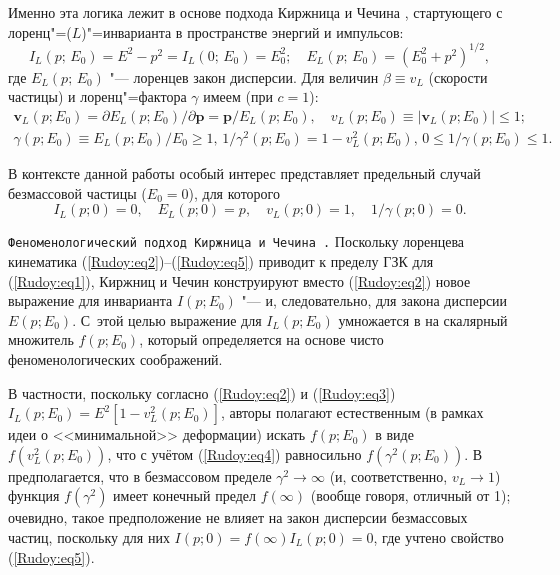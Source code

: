  Именно эта логика лежит в основе подхода Киржница и Чечина
\cite{Rudoy:KIRSHNIZ}, стартующего с лоренц"=($L$)"=инварианта  в пространстве энергий и импульсов:
\begin{equation}
    I_L(p;\,E_0)=E^2-p^2=I_L(0;\,E_0)=E_0^2;\quad E_L(p;\,E_0)=(E_0^2+p^2)^{1/2},
    \label{Rudoy:eq2}
\end{equation}
где $E_L(p;\,E_0)$ "--- лоренцев закон дисперсии. Для величин $\beta\equiv v_L$ (скорости частицы) и лоренц"=фактора $\gamma$
имеем (при $c=1$):
\begin{gather}
    \textbf{v}_L(p;E_0)=\partial E_L(p;E_0)/\partial\textbf{p}=\textbf{p}/E_L(p;E_0),\quad  v_L(p;E_0)\equiv|\textbf{v}_L(p;E_0)|\leq1;
    \label{Rudoy:eq3}\\
    \gamma(p;E_0){\equiv}E_L(p;E_0)/E_0 {\geq1},\, 1/\gamma^2(p;E_0){=}1-v_L^2(p;E_0),\, 0{\leq}1/\gamma(p;E_0){\leq}1.
    \label{Rudoy:eq4}
\end{gather}

В контексте данной работы особый  интерес представляет предельный случай безмассовой частицы ($E_0=0$), для которого
\begin{equation}
    I_L(p;0)=0,\quad E_L(p;0)=p, \quad  v_L(p;0)=1, \quad 1/\gamma(p;0)=0.
    \label{Rudoy:eq5}
\end{equation}

\smallskip
{\tt Феноменологический подход Киржница и Чечина  \cite{Rudoy:KIRSHNIZ}.} Поскольку лоренцева кинематика 
(\ref{Rudoy:eq2})--(\ref{Rudoy:eq5}) приводит к пределу ГЗК для (\ref{Rudoy:eq1}), Киржниц и Чечин \cite{Rudoy:KIRSHNIZ} конструируют вместо
(\ref{Rudoy:eq2}) новое выражение для инварианта $I(p;E_0)$ "--- и, следовательно, для закона дисперсии $E(p;E_0)$. С~этой целью
выражение для $I_L(p;E_0)$ умножается в \cite{Rudoy:KIRSHNIZ} на скалярный множитель $f(p;E_0)$, который определяется на основе
чисто феноменологических соображений.

В частности, поскольку согласно (\ref{Rudoy:eq2}) и (\ref{Rudoy:eq3})  $I_L(p;E_0)=E^2[1-v_L^2(p;E_0)]$, авторы полагают
естественным (в рамках идеи о <<минимальной>> деформации) искать $f(p;E_0)$ в виде $f(v_L^2(p;E_0))$, что с учётом
(\ref{Rudoy:eq4}) равносильно $f(\gamma^2(p;E_0))$. В \cite{Rudoy:KIRSHNIZ} предполагается, что в безмассовом пределе
$\gamma^2\rightarrow\infty$ (и, соответственно, $v_L\rightarrow1$) функция $f(\gamma^2)$ имеет конечный предел $f(\infty)$
(вообще говоря, отличный от 1); очевидно, такое предположение не влияет на закон дисперсии безмассовых частиц, поскольку для них
$I(p;0)=f(\infty)I_L(p;0)=0$, где учтено свойство (\ref{Rudoy:eq5}).

